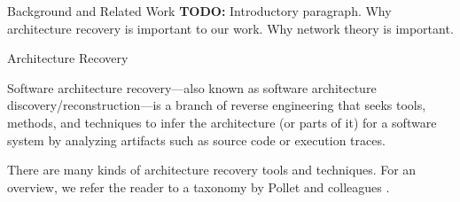 \documentclass[11pt,twocolumn,a4paper,english]{article}
\newcommand{\TODO}{\textbf{TODO:} }
\begin{document}

\begin{section}{Background and Related Work}
	\TODO Introductory paragraph. Why architecture recovery is important to our work. Why network theory is important.
	

\begin{subsection}{Architecture Recovery}
	
	Software architecture recovery---also known as software architecture discovery/reconstruction---is a branch of reverse engineering that seeks tools, methods, and techniques to infer the architecture (or parts of it) for a software system by analyzing artifacts such as source code or execution traces.
	
	There are many kinds of architecture recovery tools and techniques. For an overview, we refer the reader to a taxonomy by Pollet and colleagues \cite{Pollet2007}.
	

\end{subsection}
\end{section}
\end{document}
